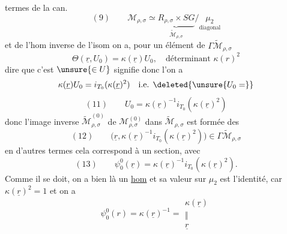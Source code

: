 termes de la  can.
\[
(9)\qquad\mathcal M_{\rho,\sigma}\simeq
\underbrace{R_{\rho,\sigma}\times SG}_{\widetilde{\mathcal M}_{\rho,\sigma}}
/\underset{\text{diagonal}}{\mu_2}
\]
et de l'hom
 inverse de l'isom
on a, pour un élément
de $\Gamma\widetilde{\mathcal M}_{\rho,\sigma}$
\[
\Theta(\underline r,U_0)=\kappa(\underline r)U_0,\quad
\text{déterminant }\kappa(r)^2
\]
dire que c'est $\unsure{\in U}$ signifie donc l'on a
\[
\kappa(\underline r)U_0=i_{T_0}(\kappa(\underline r)^2)
\quad\text{i.e. }\deleted{\unsure{U_0=}}
\]
\[
(11)\qquad U_0=\kappa(\underline r)^{-1}i_{T_0}(\kappa(\underline r)^2)
\]
donc l'image inverse $\widetilde{\mathcal M}_{\rho,\sigma}^{(0)}$ de
$\mathcal M_{\rho,\sigma}^{(0)}$ dans $\widetilde{\mathcal M}_{\rho,\sigma}$ est formée des
\[
(12)\qquad
\bigl(\underline r,\kappa(\underline r)^{-1}i_{T_0}(\kappa(\underline r)^2)\bigr)
\in\Gamma\widetilde{\mathcal M}_{\rho,\sigma}
\]
en d'autres termes cela correspond à un  section, avec
\[
(13)\qquad\psi^0_0(\underline r)=\kappa(\underline r)^{-1}i_{T_0}(\kappa(\underline r)^2).
\]
Comme il se doit, on a bien là un \uline{hom}
et sa valeur sur $\mu_2$ est l'identité,
car $\kappa(\underline r)^2=1$ et on a
\[
\psi^0_0(r)=\kappa(\underline r)^{-1}=
\begin{gathered}\kappa(\underline r)\\\Vert\\\underline r\end{gathered}
\]

